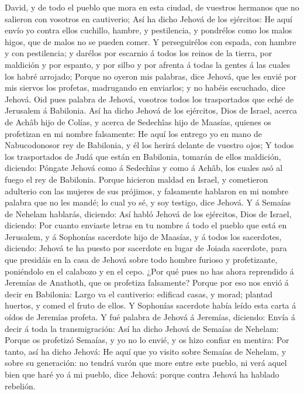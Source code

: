 David, y de todo el pueblo que mora en esta ciudad, de vuestros hermanos
que no salieron con vosotros en cautiverio;  Así ha dicho
Jehová de los ejércitos: He aquí envío yo contra ellos cuchillo, hambre,
y pestilencia, y pondrélos como los malos higos, que de malos no se
pueden comer.  Y perseguirélos con espada, con hambre y
con pestilencia; y darélos por escarnio á todos los reinos de la tierra,
por maldición y por espanto, y por silbo y por afrenta á todas la gentes
á las cuales los habré arrojado;  Porque no oyeron mis
palabras, dice Jehová, que les envié por mis siervos los profetas,
madrugando en enviarlos; y no habéis escuchado, dice Jehová.
 Oid pues palabra de Jehová, vosotros todos los
trasportados que eché de Jerusalem á Babilonia.  Así ha
dicho Jehová de los ejércitos, Dios de Israel, acerca de Achâb hijo de
Colías, y acerca de Sedechîas hijo de Maasías, quienes os profetizan en
mi nombre falsamente: He aquí los entrego yo en mano de Nabucodonosor
rey de Babilonia, y él los herirá delante de vuestro ojos;
 Y todos los trasportados de Judá que están en Babilonia,
tomarán de ellos maldición, diciendo: Póngate Jehová como á Sedechîas y
como á Achâb, los cuales asó al fuego el rey de Babilonia.
 Porque hicieron maldad en Israel, y cometieron adulterio
con las mujeres de sus prójimos, y falsamente hablaron en mi nombre
palabra que no les mandé; lo cual yo sé, y soy testigo, dice Jehová.
 Y á Semaías de Nehelam hablarás, diciendo:
 Así habló Jehová de los ejércitos, Dios de Israel,
diciendo: Por cuanto enviaste letras en tu nombre á todo el pueblo que
está en Jerusalem, y á Sophonías sacerdote hijo de Maasías, y á todos
los sacerdotes, diciendo:  Jehová te ha puesto por
sacerdote en lugar de Joiada sacerdote, para que presidáis en la casa de
Jehová sobre todo hombre furioso y profetizante, poniéndolo en el
calabozo y en el cepo.  ¿Por qué pues no has ahora
reprendido á Jeremías de Anathoth, que os profetiza falsamente?
 Porque por eso nos envió á decir en Babilonia: Largo va
el cautiverio: edificad casas, y morad; plantad huertos, y comed el
fruto de ellos.  Y Sophonías sacerdote había leído esta
carta á oídos de Jeremías profeta.  Y fué palabra de
Jehová á Jeremías, diciendo:  Envía á decir á toda la
transmigración: Así ha dicho Jehová de Semaías de Nehelam: Porque os
profetizó Semaías, y yo no lo envié, y os hizo confiar en mentira:
 Por tanto, así ha dicho Jehová: He aquí que yo visito
sobre Semaías de Nehelam, y sobre su generación: no tendrá varón que
more entre este pueblo, ni verá aquel bien que haré yo á mi pueblo, dice
Jehová: porque contra Jehová ha hablado rebelión.

